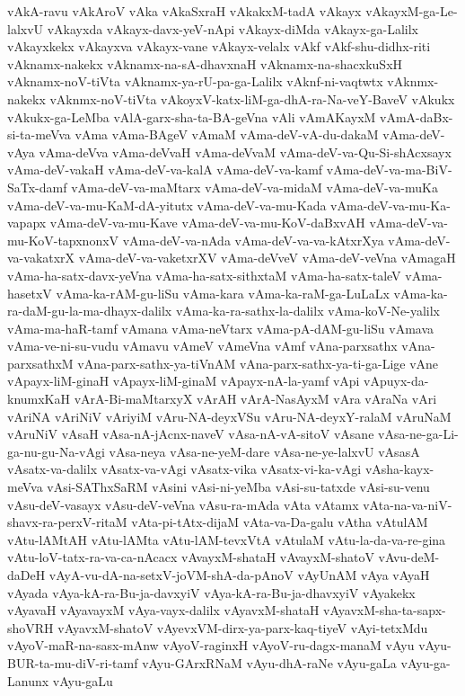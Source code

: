 {vAkA-ravu
vAkAroV
vAka
vAkaSxraH
vAkakxM-tadA
vAkayx
vAkayxM-ga-Le-lalxvU
vAkayxda
vAkayx-davx-yeV-nApi
vAkayx-diMda
vAkayx-ga-Lalilx
vAkayxkekx
vAkayxva
vAkayx-vane
vAkayx-velalx
vAkf
vAkf-shu-didhx-riti
vAknamx-nakekx
vAknamx-na-sA-dhavxnaH
vAknamx-na-shacxkuSxH
vAknamx-noV-tiVta
vAknamx-ya-rU-pa-ga-Lalilx
vAknf-ni-vaqtwtx
vAknmx-nakekx
vAknmx-noV-tiVta
vAkoyxV-katx-liM-ga-dhA-ra-Na-veY-BaveV
vAkukx
vAkukx-ga-LeMba
vAlA-garx-sha-ta-BA-geVna
vAli
vAmAKayxM
vAmA-daBx-si-ta-meVva
vAma
vAma-BAgeV
vAmaM
vAma-deV-vA-du-dakaM
vAma-deV-vAya
vAma-deVva
vAma-deVvaH
vAma-deVvaM
vAma-deV-va-Qu-Si-shAcxsayx
vAma-deV-vakaH
vAma-deV-va-kalA
vAma-deV-va-kamf
vAma-deV-va-ma-BiV-SaTx-damf
vAma-deV-va-maMtarx
vAma-deV-va-midaM
vAma-deV-va-muKa
vAma-deV-va-mu-KaM-dA-yitutx
vAma-deV-va-mu-Kada
vAma-deV-va-mu-Ka-vapapx
vAma-deV-va-mu-Kave
vAma-deV-va-mu-KoV-daBxvAH
vAma-deV-va-mu-KoV-tapxnonxV
vAma-deV-va-nAda
vAma-deV-va-va-kAtxrXya
vAma-deV-va-vakatxrX
vAma-deV-va-vaketxrXV
vAma-deVveV
vAma-deV-veVna
vAmagaH
vAma-ha-satx-davx-yeVna
vAma-ha-satx-sithxtaM
vAma-ha-satx-taleV
vAma-hasetxV
vAma-ka-rAM-gu-liSu
vAma-kara
vAma-ka-raM-ga-LuLaLx
vAma-ka-ra-daM-gu-la-ma-dhayx-dalilx
vAma-ka-ra-sathx-la-dalilx
vAma-koV-Ne-yalilx
vAma-ma-haR-tamf
vAmana
vAma-neVtarx
vAma-pA-dAM-gu-liSu
vAmava
vAma-ve-ni-su-vudu
vAmavu
vAmeV
vAmeVna
vAmf
vAna-parxsathx
vAna-parxsathxM
vAna-parx-sathx-ya-tiVnAM
vAna-parx-sathx-ya-ti-ga-Lige
vAne
vApayx-liM-ginaH
vApayx-liM-ginaM
vApayx-nA-la-yamf
vApi
vApuyx-da-knumxKaH
vArA-Bi-maMtarxyX
vArAH
vArA-NasAyxM
vAra
vAraNa
vAri
vAriNA
vAriNiV
vAriyiM
vAru-NA-deyxVSu
vAru-NA-deyxY-ralaM
vAruNaM
vAruNiV
vAsaH
vAsa-nA-jAcnx-naveV
vAsa-nA-vA-sitoV
vAsane
vAsa-ne-ga-Li-ga-nu-gu-Na-vAgi
vAsa-neya
vAsa-ne-yeM-dare
vAsa-ne-ye-lalxvU
vAsasA
vAsatx-va-dalilx
vAsatx-va-vAgi
vAsatx-vika
vAsatx-vi-ka-vAgi
vAsha-kayx-meVva
vAsi-SAThxSaRM
vAsini
vAsi-ni-yeMba
vAsi-su-tatxde
vAsi-su-venu
vAsu-deV-vasayx
vAsu-deV-veVna
vAsu-ra-mAda
vAta
vAtamx
vAta-na-va-niV-shavx-ra-perxV-ritaM
vAta-pi-tAtx-dijaM
vAta-va-Da-galu
vAtha
vAtulAM
vAtu-lAMtAH
vAtu-lAMta
vAtu-lAM-tevxVtA
vAtulaM
vAtu-la-da-va-re-gina
vAtu-loV-tatx-ra-va-ca-nAcacx
vAvayxM-shataH
vAvayxM-shatoV
vAvu-deM-daDeH
vAyA-vu-dA-na-setxV-joVM-shA-da-pAnoV
vAyUnAM
vAya
vAyaH
vAyada
vAya-kA-ra-Bu-ja-davxyiV
vAya-kA-ra-Bu-ja-dhavxyiV
vAyakekx
vAyavaH
vAyavayxM
vAya-vayx-dalilx
vAyavxM-shataH
vAyavxM-sha-ta-sapx-shoVRH
vAyavxM-shatoV
vAyevxVM-dirx-ya-parx-kaq-tiyeV
vAyi-tetxMdu
vAyoV-maR-na-sasx-mAnw
vAyoV-raginxH
vAyoV-ru-dagx-manaM
vAyu
vAyu-BUR-ta-mu-diV-ri-tamf
vAyu-GArxRNaM
vAyu-dhA-raNe
vAyu-gaLa
vAyu-ga-Lanunx
vAyu-gaLu
}
